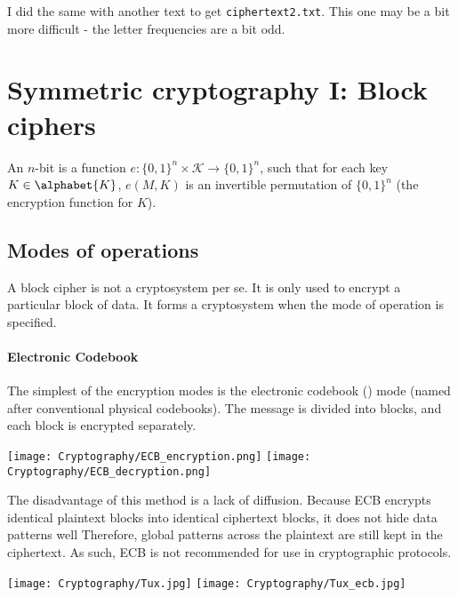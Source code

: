 \documentclass[a4paper, 11pt, openany]{book}
\begin{document}
\begin{exercise} \label{exercise:substitution2}
I did the same with another text to get \texttt{ciphertext2.txt}. This one may be a bit more difficult - the letter frequencies are a bit odd.
\end{exercise}


\section{Symmetric cryptography I: Block ciphers}
\label{sec:12}


An $n$-bit  is a function $e : \{0,1\}^n \times \mathcal{K} \to \{0,1\}^n$, such that for each
key $K \in \alphabet{K}$, $e(M,K)$ is an invertible permutation of $\{0,1\}^n$ (the encryption function for $K$).



\subsection{Modes of operations}

A block cipher is not a cryptosystem per se. It is only used to encrypt a particular block of data. It forms a cryptosystem when the mode of operation is specified.

\paragraph{Electronic Codebook}
The simplest of the encryption modes is the electronic codebook () mode (named after conventional physical codebooks). The message is divided into blocks, and each block is encrypted separately.

\begin{center}
    \texttt{[image: Cryptography/ECB\_encryption.png]}
    \texttt{[image: Cryptography/ECB\_decryption.png]}
\end{center}


The disadvantage of this method is a lack of diffusion. Because ECB encrypts identical plaintext blocks into identical ciphertext blocks, it does not hide data patterns well Therefore, global patterns across the plaintext are still kept in the ciphertext. As such, ECB is not recommended for use in cryptographic protocols.


\begin{center}
    \texttt{[image: Cryptography/Tux.jpg]} \hspace{2cm} \texttt{[image: Cryptography/Tux\_ecb.jpg]}
\end{center}
\end{document}
